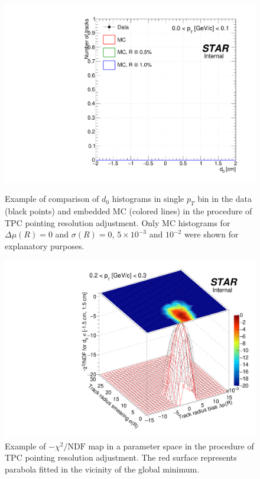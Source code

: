\begin{figure}[t!]%
\centering%
\begin{minipage}{.4725\textwidth}%
  \centering%
  \includegraphics[width=\linewidth,page=5]{graphics/tpcHelixAdj/D0ComparisonForChiSqMinimization.pdf}%
  \caption[Example of comparison of $d_{0}$ histograms in the data and embedded MC in the procedure of TPC pointing resolution adjustment.]{Example of comparison of $d_{0}$ histograms in single $p_{T}$ bin in the data (black points) and embedded MC (colored lines) in the procedure of TPC pointing resolution adjustment. Only MC histograms for $\Delta\mu(R)=0$ and $\sigma(R)=0$, $5\times10^{-3}$ and $10^{-2}$ were shown for explanatory purposes.}\label{fig:d0ForChiSqMin}
\end{minipage}%
\quad\quad%
\begin{minipage}{.4725\textwidth}%
  \centering
  \includegraphics[width=\linewidth,page=3]{graphics/tpcHelixAdj/ChiSqVsSmearingVsBias.pdf}%
  \caption[Example of $-\chi^{2}/\text{NDF}$ map in a parameter space in the procedure of TPC pointing resolution adjustment.]{Example of $-\chi^{2}/\text{NDF}$ map in a parameter space in the procedure of TPC pointing resolution adjustment. The red surface represents parabola fitted in the vicinity of the global minimum.\newline\newline}\label{fig:chiSqPerNdfTpcResAdj}
\end{minipage}%
\end{figure}%
